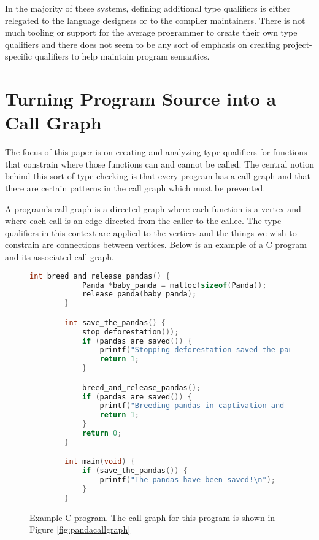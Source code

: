 In the majority of these systems, defining additional type qualifiers is either relegated to the language designers or to the compiler maintainers.  There is not much tooling or support for the average programmer to create their own type qualifiers and there does not seem to be any sort of emphasis on creating project-specific qualifiers to help maintain program semantics.

\section{Turning Program Source into a Call Graph}\label{sec:bac:callgraph}

The focus of this paper is on creating and analyzing type qualifiers for functions that constrain where those functions can and cannot be called.  The central notion behind this sort of type checking is that every program has a call graph and that there are certain patterns in the call graph which must be prevented.  

A program's call graph is a directed graph where each function is a vertex and where each call is an edge directed from the caller to the callee.  The type qualifiers in this context are applied to the vertices and the things we wish to constrain are connections between vertices.  Below is an example of a C program and its associated call graph.

\begin{figure}
    \begin{lstlisting}[language=C,gobble=8]
        int breed_and_release_pandas() {
            Panda *baby_panda = malloc(sizeof(Panda));
            release_panda(baby_panda);
        }

        int save_the_pandas() {
            stop_deforestation());
            if (pandas_are_saved()) {
                printf("Stopping deforestation saved the pandas!\n");
                return 1;
            }

            breed_and_release_pandas();
            if (pandas_are_saved()) {
                printf("Breeding pandas in captivation and releasing them has saved the pandas!\n");
                return 1;
            }
            return 0;
        }

        int main(void) {
            if (save_the_pandas()) {
                printf("The pandas have been saved!\n");
            }
        }
    \end{lstlisting}
    \caption{Example C program.  The call graph for this program is shown in Figure \ref{fig:pandacallgraph}}
    \label{lst:pandasource}
\end{figure}

